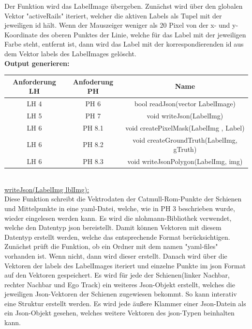 \documentclass[11pt]{scrartcl}
\begin{document}
\noindent
Der Funktion wird das LabelImage übergeben. Zunächst wird über den globalen Vektor "activeRails" iteriert, welcher die aktiven Labels als Tupel mit der jeweiligen id hält. Wenn der Mauszeiger weniger als 20 Pixel von der x- und y-Koordinate des oberen Punktes der Linie, welche für das Label mit der jeweiligen Farbe steht, entfernt ist, dann wird das Label mit der korrespondierenden id aus dem Vektor labels des LabelImages gelöscht.
\\

\noindent
\textbf{Output generieren:}
\\

\noindent
\begin{tabular}[h]{c|c|c}
Anforderung LH & Anfoderung PH & Name \\
\hline
 LH 4& PH 6 & bool readJson(vector LabelImage)\\
LH 5 & PH 7 & void writeJson(LabelImg)\\
LH 6 & PH 8.1 & void createPixelMask(LabelImg , Label)\\
LH 6 & PH 8.2 & void createGroundTruth(LabelImg, gTruth)\\
LH 6 & PH 8.3 & void writeJsonPolygon(LabelImg, img)\\
\end{tabular}
\\

\noindent
\underline{writeJson(LabelImg lblImg):}
\\

\noindent
Diese Funktion schreibt die Vektrodaten der Catmull-Rom-Punkte der Schienen und Mittelpunkte in eine yaml-Datei, welche, wie in PH 3 beschrieben wurde, wieder eingelesen werden kann. Es wird die nlohmann-Bibliothek verwendet, welche den Datentyp json bereistellt. Damit können Vektoren mit diesem Datentyp erstellt werden, welche das entsprechende Format berücksichtigen. Zunächst prüft die Funktion, ob ein Ordner mit dem namen "yaml-files" vorhanden ist. Wenn nicht, dann wird dieser erstellt. Danach wird über die Vektoren der labels des LabelImages iteriert und einzelne Punkte im json Format auf den Vektoren gespeichert.  Es wird für jede der Schienen(linker Nachbar, rechter Nachbar und Ego Track) ein weiteres Json-Objekt erstellt, welches die jeweiligen Json-Vektoren der Schienen zugewiesen bekommt. So kann interativ eine Struktur erstellt werden. Es wird jede äußere Klammer einer Json-Datein als ein Json-Objekt gesehen, welches weitere Vektoren des json-Typen beinhalten kann. 
\\
\end{document}
